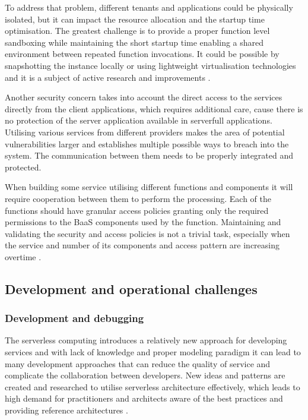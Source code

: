 To address that problem, different tenants and applications could be physically isolated, but it can impact the resource allocation and the startup time optimisation. The greatest challenge is to provide a proper function level sandboxing while maintaining the short startup time enabling a shared environment between repeated function invocations. It could be possible by snapshotting the instance locally or using lightweight virtualisation technologies and it is a subject of active research and improvements \cite{BerkeleyServerless}.

Another security concern takes into account the direct access to the services directly from the client applications, which requires additional care, cause there is no protection of the server application available in serverfull applications. Utilising various services from different providers makes the area of potential vulnerabilities larger and establishes multiple possible ways to breach into the system. The communication between them needs to be properly integrated and protected.

When building some service utilising different functions and components it will require cooperation between them to perform the processing. Each of the functions should have granular access policies granting only the required permissions to the BaaS components used by the function. Maintaining and validating the security and access policies is not a trivial task, especially when the service and number of its components and access pattern are increasing overtime \cite{MartinFowlerServerless}.

\subsection{Development and operational challenges}

\subsubsection*{Development and debugging}

The serverless computing introduces a relatively new approach for developing services and with lack of knowledge and proper modeling paradigm it can lead to many development approaches that can reduce the quality of service and complicate the collaboration between developers. New ideas and patterns are created and researched to utilise serverless architecture effectively, which leads to high demand for practitioners and architects aware of the best practices and providing reference architectures \cite{ServerlessComputingSurveyOfOpportunitiesChallengesApplications}.

